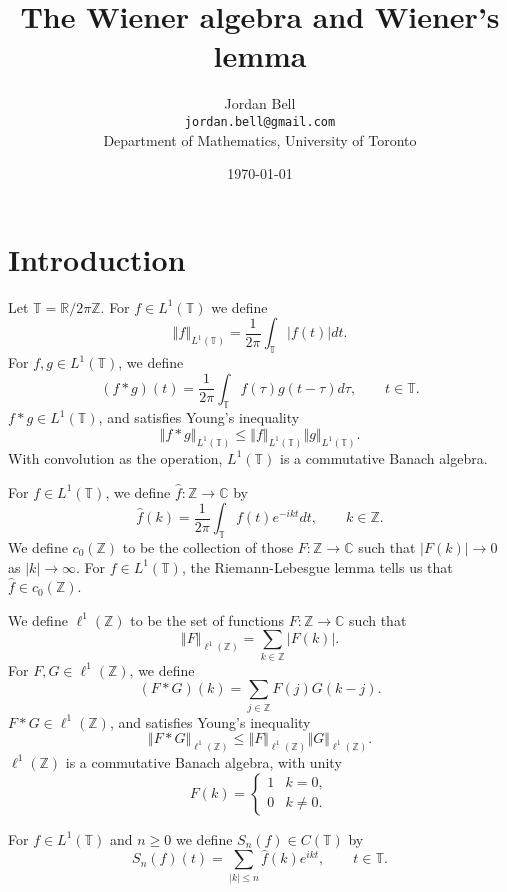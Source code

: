 \documentclass{article}
\newcommand{\norm}[1]{\left\Vert #1 \right\Vert}
\theoremstyle{definition}
\begin{document}
\title{The Wiener algebra and Wiener's lemma}
\author{Jordan Bell\\ \texttt{jordan.bell@gmail.com}\\Department of Mathematics, University of Toronto}
\date{\today}

\maketitle

\section{Introduction}
Let $\mathbb{T}=\mathbb{R} / 2\pi \mathbb{Z}$.
For $f \in L^1(\mathbb{T})$ we define
\[
\norm{f}_{L^1(\mathbb{T})} = \frac{1}{2\pi} \int_\mathbb{T} |f(t)| dt.
\]
For $f,g \in L^1(\mathbb{T})$, we define
\[
(f*g)(t) = \frac{1}{2\pi} \int_{\mathbb{T}} f(\tau)g(t-\tau) d\tau, \qquad t \in \mathbb{T}.
\]
$f*g \in L^1(\mathbb{T})$, and  satisfies Young's inequality
\[
\norm{f*g}_{L^1(\mathbb{T})} \leq \norm{f}_{L^1(\mathbb{T})}
\norm{g}_{L^1(\mathbb{T})}.
\]
With convolution as the operation, $L^1(\mathbb{T})$ is a commutative Banach algebra.


For $f \in L^1(\mathbb{T})$, we define $\hat{f}:\mathbb{Z} \to \mathbb{C}$ by
\[
\hat{f}(k) = \frac{1}{2\pi} \int_{\mathbb{T}} f(t)  e^{-ikt} dt, \qquad k \in \mathbb{Z}.
\]
We define $c_0(\mathbb{Z})$ to be the collection of those $F:\mathbb{Z} \to \mathbb{C}$ such that
$|F(k)| \to 0$ as $|k| \to \infty$. For $f \in L^1(\mathbb{T})$, the Riemann-Lebesgue lemma tells us that
 $\hat{f} \in c_0(\mathbb{Z})$.

We define $\ell^1(\mathbb{Z})$ to be the set of functions $F:\mathbb{Z} \to \mathbb{C}$ such that
\[
\norm{F}_{\ell^1(\mathbb{Z})} = \sum_{k \in \mathbb{Z}} |F(k)|.
\]
For $F,G \in \ell^1(\mathbb{Z})$, we define
\[
(F*G)(k) = \sum_{j \in \mathbb{Z}} F(j)G(k-j).
\]
$F*G \in \ell^1(\mathbb{Z})$, and  satisfies Young's inequality
\[
\norm{F*G}_{\ell^1(\mathbb{Z})} \leq \norm{F}_{\ell^1(\mathbb{Z})}
\norm{G}_{\ell^1(\mathbb{Z})}.
\]
$\ell^1(\mathbb{Z})$ is a commutative Banach algebra, with unity
\[
F(k) = \begin{cases}
1&k=0,\\
0&k \neq 0.
\end{cases}
\]


For $f \in L^1(\mathbb{T})$ and $n \geq 0$ we define $S_n(f) \in C(\mathbb{T})$ by
\[
S_n(f)(t) = \sum_{|k| \leq n} \hat{f}(k) e^{ikt}, \qquad t \in \mathbb{T}.
\]
\end{document}
